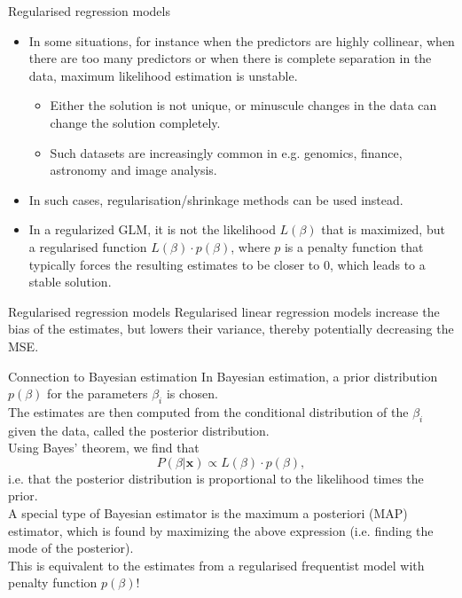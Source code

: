 \documentclass[10pt]{beamer}
\begin{document}
\begin{frame}{Regularised regression models}
\begin{itemize}
\item In some situations, for instance when the predictors are highly collinear, when there are too many predictors or when there is complete separation in the data, maximum likelihood estimation is unstable.\pause
\begin{itemize}
\item Either the solution is not unique, or minuscule changes in the data can change the solution completely.\pause
\item Such datasets are increasingly common in e.g. genomics, finance, astronomy and image analysis.\\[3mm]\pause
\end{itemize}

\item In such cases, {\color{uured}regularisation/shrinkage methods} can be used instead.\\[3mm]\pause
\item In a regularized GLM, it is not the likelihood $L(\beta)$ that is maximized, but a {\color{uured}regularised} function $L(\beta) \cdot p(\beta)$, where $p$ is a penalty function that typically forces the resulting estimates to be closer to 0, which leads to a stable solution.
\end{itemize}
\end{frame}

\begin{frame}{Regularised regression models}
Regularised linear regression models increase the {\color{uured}bias} of the estimates, but lowers their {\color{uured}variance}, thereby potentially decreasing the MSE.
\end{frame}

\begin{frame}{Connection to Bayesian estimation}
In Bayesian estimation, a {\color{uured}prior distribution} $p(\beta)$ for the parameters $\beta_i$ is chosen.\\[3mm]\pause
The estimates are then computed from the conditional distribution of the $\beta_i$ given the data, called the {\color{uured}posterior distribution}.\\[3mm]\pause
Using Bayes' theorem, we find that
$$P(\beta|\mathbf{x})\propto L(\beta)\cdot p(\beta),$$
i.e. that the posterior distribution is proportional to the likelihood times the prior.\\[3mm]
A special type of Bayesian estimator is the {\color{uured}maximum a posteriori (MAP)} estimator, which is found by maximizing the above expression (i.e. finding the mode of the posterior).\\[3mm]
This is equivalent to the estimates from a regularised frequentist model with penalty function $p(\beta)$!
\end{frame}
\end{document}
